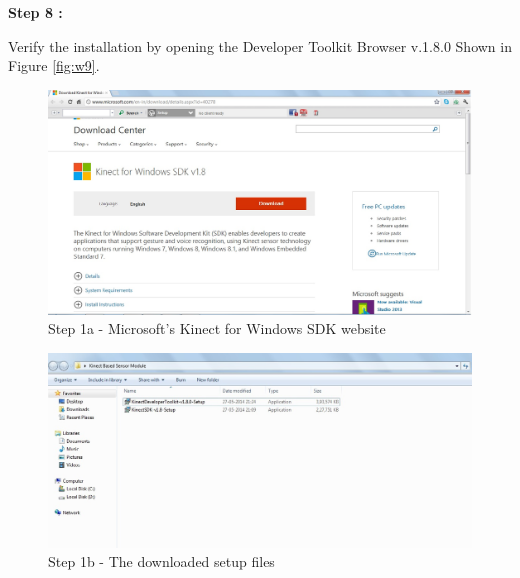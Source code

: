 \begin{flushleft}
\textbf{Step 8 :}

\medskip
Verify the installation by opening the Developer Toolkit Browser v.1.8.0
Shown in Figure \ref{fig:w9}.

\medskip

\medskip
\begin{figure}
\begin{center}
\includegraphics[scale=0.4]{website}
\end{center}
\caption{Step 1a - Microsoft's Kinect for Windows SDK website}
\label{fig:w1}
\end{figure}

\medskip
\begin{figure}
\begin{center}
\includegraphics[scale=0.5]{downloaded}
\end{center}
\caption{Step 1b - The downloaded setup files}
\label{fig:w2}
\end{figure}
\medskip


\end{flushleft}

